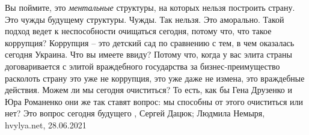Вы поймите, это \emph{ментальные} структуры, на которых нельзя построить страну. Это
чужды будущему структуры. Чужды. Так нельзя. Это аморально. Такой подход ведет
к неспособности очищаться сегодня, потому что, что такое коррупция? Коррупция –
это детский сад по сравнению с тем, в чем оказалась сегодня Украина.  Что вы
имеете ввиду?  Потому что, когда у вас элита страны договаривается с элитой
враждебного государства за бизнес-преимущество расколоть страну это уже не
коррупция, это уже даже не измена, это враждебные действия. Можем ли мы сегодня
очиститься? То есть, как бы Гена Друзенко и Юра Романенко они же так ставят
вопрос: мы способны от этого очиститься или нет? Это вопрос сегодня будущего
, 
Сергей Дацюк; Людмила Немыря, hvylya.net, 28.06.2021

